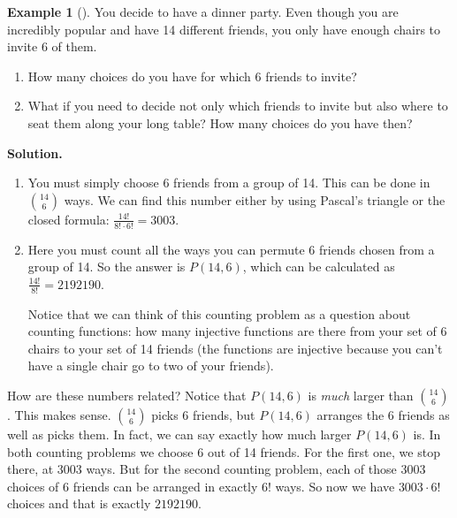 \documentclass[10pt,]{book}
\theoremstyle{plain}
\theoremstyle{definition}
\theoremstyle{definition}
\newtheorem{example}[theorem]{Example}
\theoremstyle{definition}
\theoremstyle{definition}
\numberwithin{equation}{chapter}
\begin{document}
\begin{example}[]\label{example-46}
\hypertarget{p-919}{}%
You decide to have a dinner party. Even though you are incredibly popular and have 14 different friends, you only have enough chairs to invite 6 of them.%
\par
\hypertarget{p-920}{}%
\leavevmode%
\begin{enumerate}
\item\hypertarget{li-426}{}\hypertarget{p-921}{}%
How many choices do you have for which 6 friends to invite?%
\item\hypertarget{li-427}{}\hypertarget{p-922}{}%
What if you need to decide not only which friends to invite but also where to seat them along your long table?  How many choices do you have then?%
\end{enumerate}
%
\par\smallskip%
\noindent\textbf{Solution.}\hypertarget{solution-100}{}\quad%
\hypertarget{p-923}{}%
\leavevmode%
\begin{enumerate}
\item\hypertarget{li-428}{}\hypertarget{p-924}{}%
You must simply choose 6 friends from a group of 14.  This can be done in \({14 \choose 6}\) ways.  We can find this number either by using Pascal's triangle or the closed formula: \(\frac{14!}{8!\cdot 6!} = 3003\).%
\item\hypertarget{li-429}{}\hypertarget{p-925}{}%
Here you must count all the ways you can permute 6 friends chosen from a group of 14.  So the answer is \(P(14, 6)\), which can be calculated as \(\frac{14!}{8!} = 2192190\).%
\par
\hypertarget{p-926}{}%
Notice that we can think of this counting problem as a question about counting functions: how many injective functions are there from your set of 6 chairs to your set of 14 friends (the functions are injective because you can't have a single chair go to two of your friends).%
\end{enumerate}
%
\par
\hypertarget{p-927}{}%
How are these numbers related? Notice that \(P(14,6)\) is \emph{much} larger than \({14 \choose 6}\). This makes sense. \({14 \choose 6}\) picks 6 friends, but \(P(14,6)\) arranges the 6 friends as well as picks them. In fact, we can say exactly how much larger \(P(14,6)\) is. In both counting problems we choose 6 out of 14 friends. For the first one, we stop there, at 3003 ways. But for the second counting problem, each of those 3003 choices of 6 friends can be arranged in exactly \(6!\) ways. So now we have \(3003\cdot 6!\) choices and that is exactly \(2192190\).%

\end{example}
\end{document}

